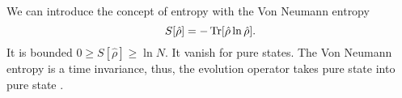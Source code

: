 We can introduce the concept of entropy with the Von Neumann entropy
\begin{equation}
    S[\hat\rho]=-\operatorname{Tr}[\hat\rho\ln\hat\rho].
\end{equation}
It is bounded $0\geq S[\hat\rho] \geq \ln N$. It vanish for pure states.
The Von Neumann entropy is a time invariance, thus, the evolution operator takes pure state into pure state \cite{Nielsen_Chuang_2010}.
\begin{comment}
    \begin{equation}
        \begin{split}
            S[\hat\rho(t)] &=\Tr[\hat\rho(t)\ln\hat\rho(t)]= \Tr[U(t,0)\hat\rho(t)U^\dagger(t,0)\ln\left(U(t,0)\hat\rho(t)U^\dagger(t,0)\right)]\\
            &=\Tr[U(t,0)\hat\rho(0)U^\dagger(t,0)U(t,0)\ln\left(\hat\rho(0)\right)U^\dagger(t,0)]\\
            &= S[\hat\rho(0)].
        \end{split}
    \end{equation}
    We can move out the evolution operator because they are unitary, since if we consider the taylor expansion
    \begin{equation}
        \begin{split}
            \ln\left(U(t,0)\hat\rho(t)U^\dagger(t,0)\right) &= c_0U(t,0)U^\dagger(t,0) + c_1 U(t,0)\hat\rho(t)U^\dagger(t,0)\\
            & \quad + c_2 U(t,0)\hat\rho(t)U^\dagger(t,0)U(t,0)\hat\rho(t)U^\dagger(t,0) + ... \\
            &=  U(t,0)\ln\left(\hat\rho(t)\right) U^\dagger(t,0).
        \end{split}
    \end{equation}
\end{comment}

\begin{comment}
If we consider the system in contact with a thermal bath with which exchange only energy but conserving it in average, namely the canonical condition hold, there is a stationary state $\hat\rho = e^{-\beta \hat L}$ that maximize the entropy. The parameter $\beta$ is just the inverse of a pseudo-temperature that stands for the interaction with the thermal bath. 
Since the thermal bath actively changes the entries of $\hat L$, it is changing the weight of the network and the probability to move from node $i$ to $j$. Thus, we are considering a network that is changing randomly by time. 
The reader can recognize that this density matrix is the same the De Domenico has introduced \eqref{density_matrix}.
\end{comment}

